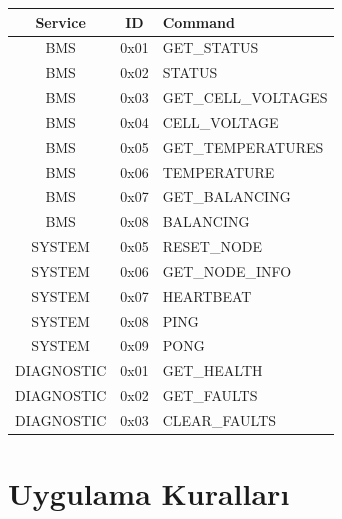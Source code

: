 \documentclass[a4paper,10pt]{article}
\begin{document}
\begin{center}
\begin{tabular}{c c l}
\toprule
\textbf{Service} & \textbf{ID} & \textbf{Command} \\
\midrule

BMS & 0x01 & GET\_STATUS \\
BMS & 0x02 & STATUS \\
BMS & 0x03 & GET\_CELL\_VOLTAGES \\
BMS & 0x04 & CELL\_VOLTAGE \\
BMS & 0x05 & GET\_TEMPERATURES \\
BMS & 0x06 & TEMPERATURE \\
BMS & 0x07 & GET\_BALANCING \\
BMS & 0x08 & BALANCING \\

\midrule

SYSTEM & 0x05 & RESET\_NODE \\
SYSTEM & 0x06 & GET\_NODE\_INFO \\
SYSTEM & 0x07 & HEARTBEAT \\
SYSTEM & 0x08 & PING \\
SYSTEM & 0x09 & PONG \\

\midrule

DIAGNOSTIC & 0x01 & GET\_HEALTH \\
DIAGNOSTIC & 0x02 & GET\_FAULTS \\
DIAGNOSTIC & 0x03 & CLEAR\_FAULTS \\

\bottomrule
\end{tabular}
\end{center}

\section{Uygulama Kuralları}
\end{document}
